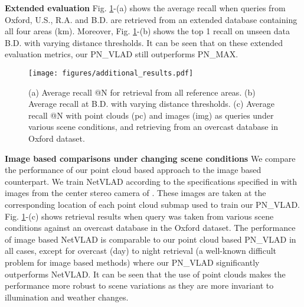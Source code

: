 \documentclass[10pt,twocolumn,letterpaper]{article}
\begin{document}
\noindent\textbf{Extended evaluation}
Fig. \ref{fig:add_results}-(a) shows the average recall when queries from Oxford, U.S., R.A. and B.D. are retrieved from an extended database containing all four areas (km). Moreover, Fig. \ref{fig:add_results}-(b) shows the top 1 recall on unseen data B.D. with varying distance thresholds. It can be seen that on these extended evaluation metrics, our PN\_VLAD still outperforms PN\_MAX.
\newline
\begin{figure}[t]
	\begin{center}
\texttt{[image: figures/additional\_results.pdf]}
	\end{center}
	\vspace{-0.4cm}
	\caption{(a) Average recall @N for retrieval from all reference areas. (b) Average recall at B.D. with varying distance thresholds. (c) Average recall @N with point clouds (pc) and images (img) as queries under various scene conditions, and retrieving from an overcast database in Oxford dataset.\vspace{-0.4cm}}
	\label{fig:add_results}
\end{figure}

\vspace{-0.2cm}
\noindent\textbf{Image based comparisons under changing scene conditions}
We compare the performance of our point cloud based approach to the image based counterpart. We train NetVLAD according to the specifications specified in \cite{Arandjelovic16} with images from the center stereo camera of \cite{RobotCarDatasetIJRR}. These images are taken at the corresponding location of each point cloud submap used to train our PN\_VLAD. Fig. \ref{fig:add_results}-(c) shows retrieval results when query was taken from various scene conditions against an overcast database in the Oxford dataset. The performance of image based NetVLAD is comparable to our point cloud based PN\_VLAD in all cases, except for overcast (day) to night retrieval (a well-known difficult problem for image based methods) where our PN\_VLAD significantly outperforms NetVLAD. It can be seen that the use of point clouds makes the performance more robust to scene variations as they are more invariant to illumination and weather changes.
\newline
\end{document}
